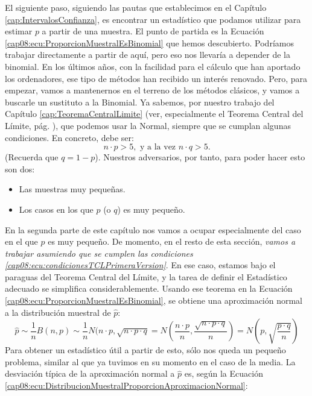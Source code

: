 El siguiente paso, siguiendo las pautas que establecimos en el Capítulo
\ref{cap:IntervalosConfianza}, es encontrar un estadístico que podamos utilizar para estimar $p$ a
partir de una muestra. El punto de partida es la Ecuación \ref{cap08:ecu:ProporcionMuestralEsBinomial}
que hemos descubierto. Podríamos trabajar directamente a partir de aquí, pero eso nos llevaría a
depender de la binomial. En los últimos años, con la facilidad para el cálculo que han aportado los
ordenadores, ese tipo de métodos han recibido un interés renovado. Pero, para empezar, vamos a
mantenernos en el terreno de los métodos clásicos, y vamos a buscarle un sustituto a la Binomial.
Ya sabemos, por nuestro trabajo del Capítulo \ref{cap:TeoremaCentralLimite} (ver, especialmente el
Teorema Central del Límite, pág. \pageref{cap05:teo:TCL}), que podemos usar la Normal, siempre que
se cumplan algunas condiciones. En concreto, debe ser:
\begin{equation}\label{cap08:ecu:condicionesTCLPrimeraVersion}
    n\cdot p> 5,\mbox{ y a la vez }n\cdot q>5.
\end{equation}
(Recuerda que $q=1-p$). Nuestros adversarios, por tanto, para poder hacer esto son dos:
\begin{itemize}
  \item Las muestras muy pequeñas.
  \item Los casos en los que $p$ (o $q$) es muy pequeño.
\end{itemize}
En la segunda parte de este capítulo nos vamos a ocupar especialmente del caso en el que $p$ es muy
pequeño. De momento, en el resto de esta sección, {\em vamos a trabajar asumiendo que se cumplen
las condiciones \ref{cap08:ecu:condicionesTCLPrimeraVersion}}. En ese caso, estamos bajo el
paraguas del Teorema Central del Límite, y la tarea de definir el Estadístico adecuado se
simplifica considerablemente. Usando ese teorema en la Ecuación \ref{cap08:ecu:ProporcionMuestralEsBinomial}, se obtiene una aproximación normal a la distribución muestral de $\hat p$:
    \begin{equation}
    \label{cap08:ecu:DistribucionMuestralProporcionAproximacionNormal}
        \hat p \sim \dfrac{1}{n}B(n,p)
        \sim \dfrac{1}{n}N(n\cdot p,\sqrt{n\cdot p\cdot q}=
        N\left(\dfrac{n\cdot p}{n},\dfrac{\sqrt{n\cdot p\cdot q}}{n}\right)=
        N\left(p,\sqrt{\dfrac{p\cdot q}{n}}\right)
    \end{equation}
Para obtener un estadístico útil a partir de esto, sólo nos queda un pequeño problema, similar al que ya tuvimos en su momento en el caso de la media. La desviación típica de la aproximación normal a $\hat p$ es, según la Ecuación \ref{cap08:ecu:DistribucionMuestralProporcionAproximacionNormal}:
